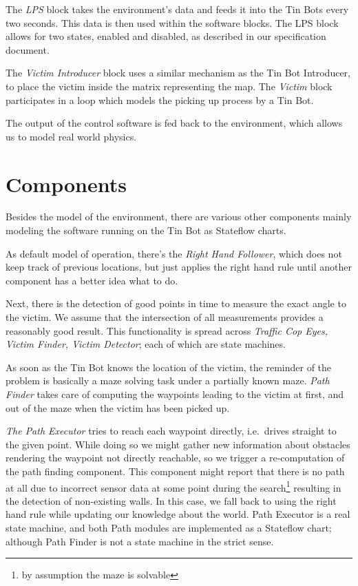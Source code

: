 \documentclass[a4paper,parskip,headheight=38pt]{scrartcl} %
\begin{document}
The \emph{LPS} block takes the environment's data and feeds it into the Tin Bots every two seconds. This data is then used within the software blocks. The LPS block allows for two states, enabled and disabled, as described in our specification document.

The \emph{Victim Introducer} block uses a similar mechanism as the Tin Bot Introducer, to place the victim inside the matrix representing the map. The \emph{Victim} block participates in a loop which models the picking up process by a Tin Bot.

The output of the control software is fed back to the environment, which allows us to model real world physics.

\section{Components}
Besides the model of the environment, there are various other components mainly modeling the software running on the Tin Bot as Stateflow charts.

As default model of operation, there's the \emph{Right Hand Follower}, which does not keep track of previous locations, but just applies the right hand rule until another component has a better idea what to do.

Next, there is the detection of good points in time to measure the exact angle to the victim.  We assume that the intersection of all measurements provides a reasonably good result.  This functionality is spread across \emph{Traffic Cop Eyes, Victim Finder, Victim Detector}; each of which are state machines.

As soon as the Tin Bot knows the location of the victim, the reminder of the problem is basically a maze solving task under a partially known maze. 
\emph{Path Finder} takes care of computing the waypoints leading to the victim at first, and out of the maze when the victim has been picked up. 

\emph{The Path Executor} tries to reach each waypoint directly, i.e.\ drives straight to the given point. 
While doing so we might gather new information about obstacles rendering the waypoint not directly reachable, so we trigger a re-computation of the path finding component. 
This component might report that there is no path at all due to incorrect sensor data at some point during the search\footnote{by assumption the maze is solvable} resulting in the detection of non-existing walls. 
In this case, we fall back to using the right hand rule while updating our knowledge about the world. Path Executor is a real state machine, and both Path modules are implemented as a Stateflow chart; although Path Finder is not a state machine in the strict sense.
\end{document}
